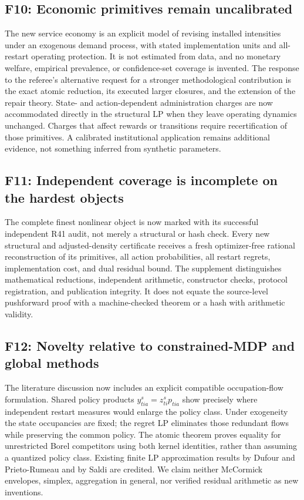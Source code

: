 \subsection*{F10: Economic primitives remain uncalibrated}
The new service economy is an explicit model of revising installed intensities under an exogenous demand process, with stated implementation units and all-restart operating protection. It is not estimated from data, and no monetary welfare, empirical prevalence, or confidence-set coverage is invented. The response to the referee's alternative request for a stronger methodological contribution is the exact atomic reduction, its executed larger closures, and the extension of the repair theory. State- and action-dependent administration charges are now accommodated directly in the structural LP when they leave operating dynamics unchanged. Charges that affect rewards or transitions require recertification of those primitives. A calibrated institutional application remains additional evidence, not something inferred from synthetic parameters.

\subsection*{F11: Independent coverage is incomplete on the hardest objects}
The complete finest nonlinear object is now marked with its successful independent R41 audit, not merely a structural or hash check. Every new structural and adjusted-density certificate receives a fresh optimizer-free rational reconstruction of its primitives, all action probabilities, all restart regrets, implementation cost, and dual residual bound. The supplement distinguishes mathematical reductions, independent arithmetic, constructor checks, protocol registration, and publication integrity. It does not equate the source-level pushforward proof with a machine-checked theorem or a hash with arithmetic validity.

\subsection*{F12: Novelty relative to constrained-MDP and global methods}
The literature discussion now includes an explicit compatible occupation-flow formulation. Shared policy products $y^s_{tia}=z^s_{ti}p_{tia}$ show precisely where independent restart measures would enlarge the policy class. Under exogeneity the state occupancies are fixed; the regret LP eliminates those redundant flows while preserving the common policy. The atomic theorem proves equality for unrestricted Borel competitors using both kernel identities, rather than assuming a quantized policy class. Existing finite LP approximation results by Dufour and Prieto-Rumeau and by Saldi are credited. We claim neither McCormick envelopes, simplex, aggregation in general, nor verified residual arithmetic as new inventions.

